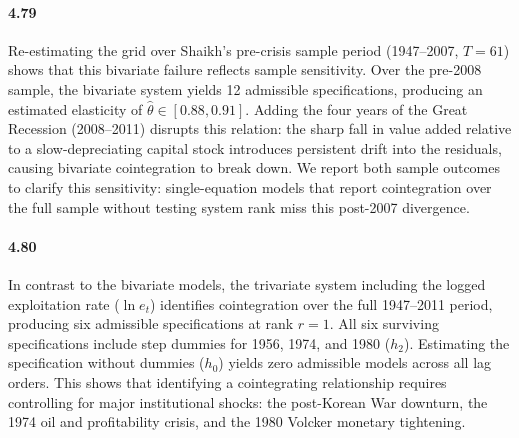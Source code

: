 \paragraph{4.79}
Re-estimating the grid over Shaikh's pre-crisis sample period (1947--2007, $T=61$) shows that this bivariate failure reflects sample sensitivity. Over the pre-2008 sample, the bivariate system yields 12 admissible specifications, producing an estimated elasticity of $\hat{\theta} \in [0.88, 0.91]$. Adding the four years of the Great Recession (2008--2011) disrupts this relation: the sharp fall in value added relative to a slow-depreciating capital stock introduces persistent drift into the residuals, causing bivariate cointegration to break down. We report both sample outcomes to clarify this sensitivity: single-equation models that report cointegration over the full sample without testing system rank miss this post-2007 divergence.

\paragraph{4.80}
In contrast to the bivariate models, the trivariate system including the logged exploitation rate ($\ln e_t$) identifies cointegration over the full 1947--2011 period, producing six admissible specifications at rank $r=1$. All six surviving specifications include step dummies for 1956, 1974, and 1980 ($h_2$). Estimating the specification without dummies ($h_0$) yields zero admissible models across all lag orders. This shows that identifying a cointegrating relationship requires controlling for major institutional shocks: the post-Korean War downturn, the 1974 oil and profitability crisis, and the 1980 Volcker monetary tightening.
